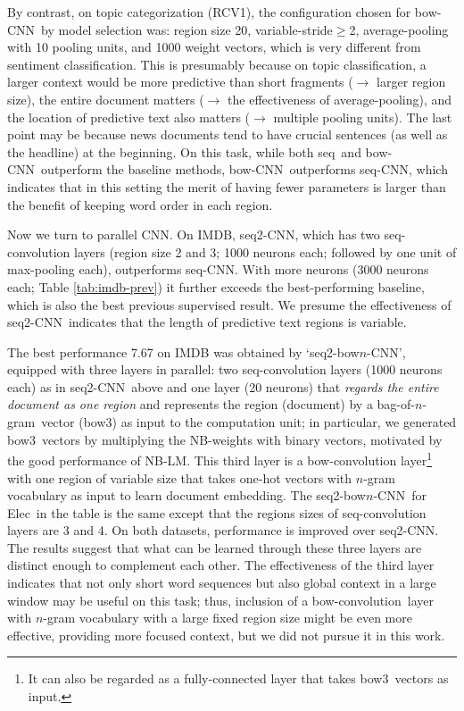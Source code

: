 \documentclass[11pt,letterpaper]{article}
\newcommand{\cnn}{CNN}
\newcommand{\scnnpfx}{seq}
\newcommand{\scnn}{seq-CNN}
\newcommand{\sscnn}{seq2-CNN}
\newcommand{\ssbcnn}{seq2-bow$n$-CNN}
\newcommand{\bcnn}{bow-CNN}
\newcommand{\bconv}{bow-convolution}
\newcommand{\bow}{{bow}}
\newcommand{\bowthree}{{bow3}}
\newcommand{\bongram}{bag-of-$n$-gram}
\newcommand{\Elec}{Elec}
\newcommand{\nbw}{NB-LM}
\begin{document}
By contrast, on topic categorization (RCV1), 
the configuration chosen for \bcnn\ by model selection was: region size 20, variable-stride$\ge$2, 
average-pooling with 10 pooling units, and 1000 weight vectors, 
which is very different from sentiment classification.  
This is presumably because 
on topic classification, a larger context would be more predictive 
than short fragments ($\rightarrow$ larger region size), 
the entire document matters ($\rightarrow$ the effectiveness of average-pooling), 
and the location of predictive text also matters ($\rightarrow$ multiple pooling units). 
The last point may be because news documents tend to have crucial sentences 
(as well as the headline) at the beginning.  
On this task, while both \scnnpfx\ and \bcnn\ outperform the baseline methods, \bcnn\ outperforms \scnn,  
which indicates that in this setting 
the merit of having fewer parameters is larger than the benefit of keeping word order 
in each region.  
 
Now we turn to parallel \cnn. On IMDB, \sscnn, which has two seq-convolution layers 
(region size 2 and 3; 1000 neurons each; followed by one unit of max-pooling each), 
outperforms \scnn.  With more neurons (3000 neurons each; Table \ref{tab:imdb-prev}) it 
further exceeds 
the best-performing baseline, which is also the best previous supervised result.    
We presume the effectiveness of \sscnn\ indicates that the length of predictive text regions 
is variable.  

The best performance 7.67 on IMDB was obtained by `\ssbcnn', 
equipped with three layers in parallel: 
two seq-convolution layers (1000 neurons each) as in \sscnn\ above and  
one layer (20 neurons) that {\em regards the entire document as one region} and 
represents the region (document) by a \bongram\ vector (\bowthree)
as input to the computation unit; 
in particular, we generated \bowthree\ vectors by multiplying the NB-weights with binary vectors, 
motivated by the good performance of \nbw.  
This third layer is a \bow-convolution layer\footnote{
  It can also be regarded as a fully-connected layer that takes \bowthree\ vectors as input. 
}
with one region of variable size that takes 
one-hot vectors with $n$-gram vocabulary as input to learn document embedding.  
The \ssbcnn\ for \Elec\ in the table is the same except that the regions sizes of seq-convolution layers are 
3 and 4.  On both datasets, performance is improved over \sscnn.
The results suggest that what can be learned through these three layers are distinct enough 
to complement each other.  
The effectiveness of the third layer indicates that not only short word sequences 
but also global context in a large window may be useful on this task; thus, inclusion of a 
\bconv\ layer with $n$-gram vocabulary with a large fixed region size might be even more effective, 
providing more focused context, 
but we did not pursue it in this work.  
\end{document}
